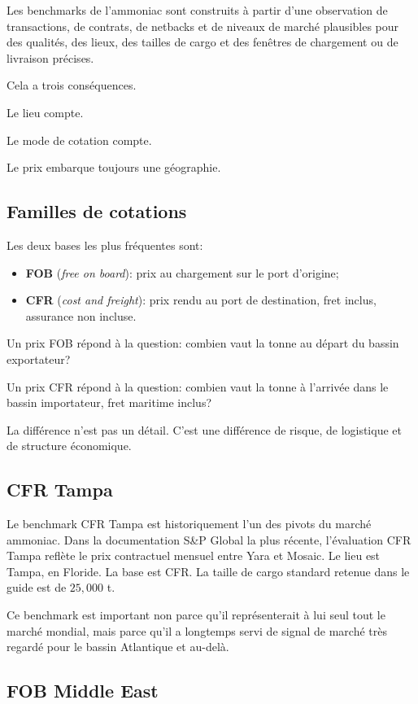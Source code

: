 \documentclass[11pt]{article}
\begin{document}
Les benchmarks de l'ammoniac sont construits à partir d'une observation de transactions, de contrats, de netbacks et de niveaux de marché plausibles pour des qualités, des lieux, des tailles de cargo et des fenêtres de chargement ou de livraison précises.

Cela a trois conséquences.

Le lieu compte.

Le mode de cotation compte.

Le prix embarque toujours une géographie.

\subsection{Familles de cotations}

Les deux bases les plus fréquentes sont:
\begin{itemize}[leftmargin=1.6em]
    \item \textbf{FOB} (\emph{free on board}): prix au chargement sur le port d'origine;
    \item \textbf{CFR} (\emph{cost and freight}): prix rendu au port de destination, fret inclus, assurance non incluse.
\end{itemize}

Un prix FOB répond à la question: combien vaut la tonne au départ du bassin exportateur?

Un prix CFR répond à la question: combien vaut la tonne à l'arrivée dans le bassin importateur, fret maritime inclus?

La différence n'est pas un détail. C'est une différence de risque, de logistique et de structure économique.

\subsection{CFR Tampa}

Le benchmark CFR Tampa est historiquement l'un des pivots du marché ammoniac. Dans la documentation S\&P Global la plus récente, l'évaluation CFR Tampa reflète le prix contractuel mensuel entre Yara et Mosaic. Le lieu est Tampa, en Floride. La base est CFR. La taille de cargo standard retenue dans le guide est de \(25{,}000\) t.

Ce benchmark est important non parce qu'il représenterait à lui seul tout le marché mondial, mais parce qu'il a longtemps servi de signal de marché très regardé pour le bassin Atlantique et au-delà.

\subsection{FOB Middle East}
\end{document}

